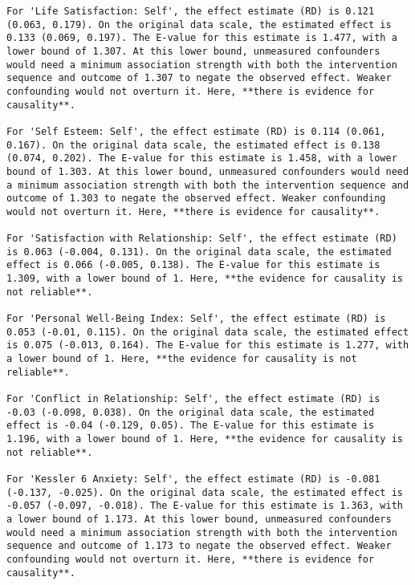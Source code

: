 \documentclass[
  singlecolumn]{article}
\begin{document}
\begin{verbatim}
For 'Life Satisfaction: Self', the effect estimate (RD) is 0.121 (0.063, 0.179). On the original data scale, the estimated effect is 0.133 (0.069, 0.197). The E-value for this estimate is 1.477, with a lower bound of 1.307. At this lower bound, unmeasured confounders would need a minimum association strength with both the intervention sequence and outcome of 1.307 to negate the observed effect. Weaker confounding would not overturn it. Here, **there is evidence for causality**.

For 'Self Esteem: Self', the effect estimate (RD) is 0.114 (0.061, 0.167). On the original data scale, the estimated effect is 0.138 (0.074, 0.202). The E-value for this estimate is 1.458, with a lower bound of 1.303. At this lower bound, unmeasured confounders would need a minimum association strength with both the intervention sequence and outcome of 1.303 to negate the observed effect. Weaker confounding would not overturn it. Here, **there is evidence for causality**.

For 'Satisfaction with Relationship: Self', the effect estimate (RD) is 0.063 (-0.004, 0.131). On the original data scale, the estimated effect is 0.066 (-0.005, 0.138). The E-value for this estimate is 1.309, with a lower bound of 1. Here, **the evidence for causality is not reliable**.

For 'Personal Well-Being Index: Self', the effect estimate (RD) is 0.053 (-0.01, 0.115). On the original data scale, the estimated effect is 0.075 (-0.013, 0.164). The E-value for this estimate is 1.277, with a lower bound of 1. Here, **the evidence for causality is not reliable**.

For 'Conflict in Relationship: Self', the effect estimate (RD) is -0.03 (-0.098, 0.038). On the original data scale, the estimated effect is -0.04 (-0.129, 0.05). The E-value for this estimate is 1.196, with a lower bound of 1. Here, **the evidence for causality is not reliable**.

For 'Kessler 6 Anxiety: Self', the effect estimate (RD) is -0.081 (-0.137, -0.025). On the original data scale, the estimated effect is -0.057 (-0.097, -0.018). The E-value for this estimate is 1.363, with a lower bound of 1.173. At this lower bound, unmeasured confounders would need a minimum association strength with both the intervention sequence and outcome of 1.173 to negate the observed effect. Weaker confounding would not overturn it. Here, **there is evidence for causality**.


\end{verbatim}
\end{document}
